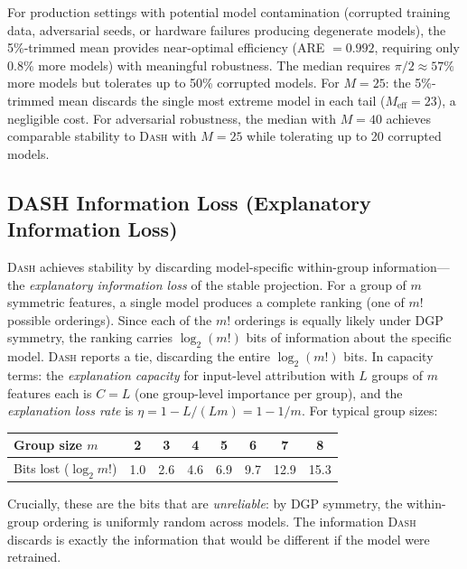 \documentclass{article}
\newcommand{\DASH}{\textsc{Dash}}
\begin{document}
For production settings with potential model contamination (corrupted training data, adversarial seeds, or hardware failures producing degenerate models), the 5\%-trimmed mean provides near-optimal efficiency (ARE $= 0.992$, requiring only $0.8\%$ more models) with meaningful robustness. The median requires $\pi/2 \approx 57\%$ more models but tolerates up to 50\% corrupted models. For $M = 25$: the 5\%-trimmed mean discards the single most extreme model in each tail ($M_{\text{eff}} = 23$), a negligible cost. For adversarial robustness, the median with $M = 40$ achieves comparable stability to \DASH{} with $M = 25$ while tolerating up to 20 corrupted models.

\subsection{DASH Information Loss (Explanatory Information Loss)}
\label{sec:info-loss}

\DASH{} achieves stability by discarding model-specific within-group information---the \emph{explanatory information loss} of the stable projection. For a group of $m$ symmetric features, a single model produces a complete ranking (one of $m!$ possible orderings). Since each of the $m!$ orderings is equally likely under DGP symmetry, the ranking carries $\log_2(m!)$ bits of information about the specific model. \DASH{} reports a tie, discarding the entire $\log_2(m!)$ bits. In capacity terms: the \emph{explanation capacity} for input-level attribution with $L$ groups of $m$ features each is $C = L$ (one group-level importance per group), and the \emph{explanation loss rate} is $\eta = 1 - L/(Lm) = 1 - 1/m$. For typical group sizes:

\begin{center}
\small
\begin{tabular}{@{}lccccccc@{}}
\toprule
Group size $m$ & 2 & 3 & 4 & 5 & 6 & 7 & 8 \\
\midrule
Bits lost ($\log_2 m!$) & 1.0 & 2.6 & 4.6 & 6.9 & 9.7 & 12.9 & 15.3 \\
\bottomrule
\end{tabular}
\end{center}

Crucially, these are the bits that are \emph{unreliable}: by DGP symmetry, the within-group ordering is uniformly random across models. The information \DASH{} discards is exactly the information that would be different if the model were retrained.
\end{document}
